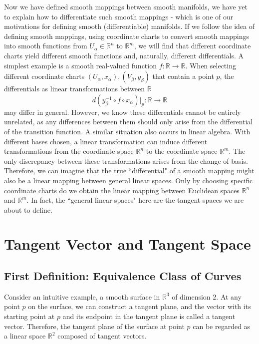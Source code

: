 \documentclass{report}
\begin{document}
Now we have defined smooth mappings between smooth manifolds, we have yet to explain how to differentiate such smooth mappings - which is one of our motivations for defining smooth (differentiable) manifolds. If we follow the idea of defining smooth mappings, using coordinate charts to convert smooth mappings into smooth functions from $U_\alpha\in\mathbb{R}^n$ to $\mathbb{R}^m$, we will find that different coordinate charts yield different smooth functions and, naturally, different differentials. A simplest example is a smooth real-valued function $f:\mathbb{R}\to\mathbb{R}$. When selecting different coordinate charts $(U_\alpha,x_\alpha),(V_\beta,y_\beta)$ that contain a point $p$, the differentials as linear transformations between $\mathbb{R}$
$$
d(y^{-1}_\beta \circ f\circ x_\alpha)|_p:\mathbb{R}\longrightarrow\mathbb{R}
$$
may differ in general. However, we know these differentials cannot be entirely unrelated, as any differences between them should only arise from the differential of the transition function. A similar situation also occurs in linear algebra. With different bases chosen, a linear transformation can induce different transformations from the coordinate space $\mathbb{R}^n$ to the coordinate space $\mathbb{R}^m$. The only discrepancy between these transformations arises from the change of basis. Therefore, we can imagine that the true ``differential" of a smooth mapping might also be a linear mapping between general linear spaces. Only by choosing specific coordinate charts do we obtain the linear mapping between Euclidean spaces $\mathbb{R}^n$ and $\mathbb{R}^m$. In fact, the ``general linear spaces" here are the tangent spaces we are about to define.

\section{Tangent Vector and Tangent Space}
\subsection{First Definition: Equivalence Class of Curves}
Consider an intuitive example, a smooth surface in $\mathbb{R}^3$ of dimension $2$. At any point $p$ on the surface, we can construct a tangent plane, and the vector with its starting point at $p$ and its endpoint in the tangent plane is called a tangent vector. Therefore, the tangent plane of the surface at point $p$ can be regarded as a linear space $\mathbb{R}^2$ composed of tangent vectors.
\end{document}
